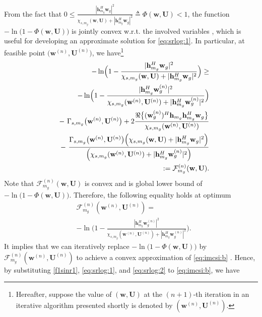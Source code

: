 \documentclass[journal,twoside]{IEEEtran}
\begin{document}
From the fact that $0\leq\frac{|\mathbf{h}_{m_g}^{H}\mathbf{w}_g|^2}{\chi_{s,m_g}(\mathbf{w},\mathbf{U})+|\mathbf{h}_{m_g}^{H}\mathbf{w}_g|^2}\triangleq \Phi(\mathbf{w},\mathbf{U}) < 1$, the function $- \ln\bigr(1 - \Phi(\mathbf{w},\mathbf{U})\bigr)$ is jointly convex w.r.t. the involved variables \cite{Stephen}, which is useful for developing an approximate solution for \eqref{eq:srlog:1}. In particular, at feasible point $\bigl(\mathbf{w}^{(n)},\mathbf{U}^{(n)}\bigr)$, we have\footnote{Hereafter, suppose the value of $(\mathbf{w},\mathbf{U})$ at the $(n+1)$-th iteration in an iterative algorithm presented shortly is denoted by $(\mathbf{w}^{(n)},\mathbf{U}^{(n)})$.}
\begin{eqnarray}
&&- \ln\Bigr(1 - \frac{|\mathbf{h}_{m_g}^{H}\mathbf{w}_g|^2}{\chi_{s,m_g}(\mathbf{w},\mathbf{U})+|\mathbf{h}_{m_g}^{H}\mathbf{w}_g|^2}\Bigr)\geq \nonumber\\
&&- \ln\Bigr(1 - \frac{|\mathbf{h}_{m_g}^{H}\mathbf{w}_g^{(n)}|^2}{\chi_{s,m_g}(\mathbf{w}^{(n)},\mathbf{U}^{(n)})+|\mathbf{h}_{m_g}^{H}\mathbf{w}_g^{(n)}|^2}\Bigr)\nonumber\\
&&-\ \Gamma_{s,m_g}\bigr(\mathbf{w}^{(n)},\mathbf{U}^{(n)}\bigr)+2\frac{\Re\bigl\{(\mathbf{w}_g^{(n)})^H\mathbf{h}_{m_g}
\mathbf{h}_{m_g}^{H}\mathbf{w}_g\bigr\}}{\chi_{s,m_g}(\mathbf{w}^{(n)},\mathbf{U}^{(n)})}\nonumber\\
&&-\  \frac{\Gamma_{s,m_g}\bigr(\mathbf{w}^{(n)},\mathbf{U}^{(n)}\bigr)\Bigl(\chi_{s,m_g}(\mathbf{w},\mathbf{U})+|\mathbf{h}_{m_g}^{H}\mathbf{w}_g|^2\Bigr)}{
\Bigl(\chi_{s,m_g}(\mathbf{w}^{(n)},\mathbf{U}^{(n)})+|\mathbf{h}_{m_g}^{H}\mathbf{w}_g^{(n)}|^2\Bigl)}\nonumber\\
&&:= \mathcal{F}_{m_g}^{(n)}(\mathbf{w},\mathbf{U}).
\label{eq:srlog:2}
\end{eqnarray}
Note that $\mathcal{F}_{m_g}^{(n)}(\mathbf{w},\mathbf{U})$ is convex and is global lower bound of $- \ln\bigr(1 - \Phi(\mathbf{w},\mathbf{U})\bigr)$. Therefore, the following equality holds at optimum
\begin{equation}\label{eq:srlog:3}\begin{aligned}
&\mathcal{F}_{m_g}^{(n)}(\mathbf{w}^{(n)},\mathbf{U}^{(n)})=\\
&- \ln\Bigr(1 - \frac{|\mathbf{h}_{m_g}^{H}\mathbf{w}_g^{(n)}|^2}{\chi_{s,m_g}(\mathbf{w}^{(n)},\mathbf{U}^{(n)})+|\mathbf{h}_{m_g}^{H}\mathbf{w}_g^{(n)}|^2}\Bigr).
\end{aligned}\end{equation}
It implies that we can iteratively replace $- \ln\bigr(1 - \Phi(\mathbf{w},\mathbf{U})\bigr)$ by $\mathcal{F}_{m_g}^{(n)}(\mathbf{w}^{(n)},\mathbf{U}^{(n)})$ to achieve a convex approximation of \eqref{eq:imcsi:b} \cite{Marks:78}. Hence, by substituting \eqref{f1sinr1}, \eqref{eq:srlog:1}, and \eqref{eq:srlog:2} to \eqref{eq:imcsi:b}, we have 
\end{document}
